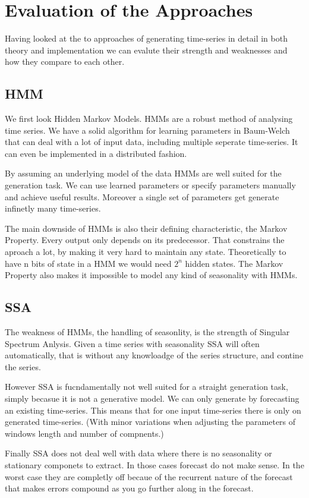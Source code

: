 
\chapter{Evaluation of the Approaches}\label{chapter:evaluation}

Having looked at the to approaches of generating time-series in detail in both theory and implementation we can evalute their strength and weaknesses and how they compare to each other. 

\section{HMM}

We first look Hidden Markov Models. HMMs are a robust method of analysing time series. We have a solid algorithm for learning parameters in Baum-Welch that can deal with a lot of input data, including multiple seperate time-series. It can even be implemented in a distributed fashion. 

By assuming an underlying model of the data HMMs are well suited for the generation task. We can use learned parameters or specify parameters manually and achieve useful results. Moreover a single set of parameters get generate infinetly many time-series. 

The main downside of HMMs is also their defining characteristic, the Markov Property. Every output only depends on its predecessor. That constrains the aproach a lot, by making it very hard to maintain any state. Theoretically to have n bits of state in a HMM we would need $2^n$ hidden states. The Markov Property also makes it impossible to model any kind of seasonality with HMMs. 

\section{SSA}

The weakness of HMMs, the handling of seasonlity, is the strength of Singular Spectrum Anlysis. Given a time series with seasonality SSA will often automatically, that is without any knowloadge of the series structure, and contine the series. 

However SSA is fucndamentally not well suited for a straight generation task, simply becasue it is not a generative model. We can only generate by forecasting an existing time-series. This means that for one input time-series there is only on generated time-series. (With minor variations when adjusting the parameters of windows length and number of compnents.)

Finally SSA does not deal well with data where there is no seasonality or stationary componets to extract. In those cases forecast do not make sense. In the worst case they are completly off becaue of the recurrent nature of the forecast that makes errors compound as you go further along in the forecast. 